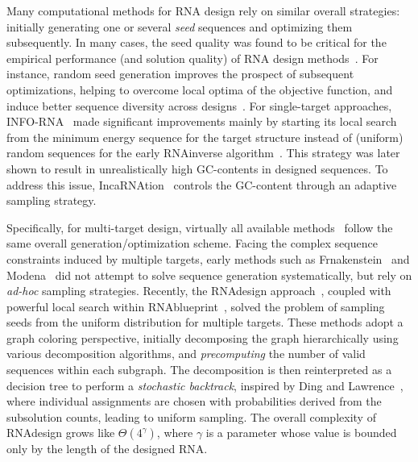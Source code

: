 \documentclass{bioinfo}
\newcommand{\Def}[1]{{\it #1}}
\newcommand{\parHead}[1]{\Final{\paragraph{#1}}}
\newcommand{\Final}[1]{#1}
\renewcommand{\Final}[1]{}
\newcommand{\Nuc}[1]{{\sf #1}}
\newcommand{\Cb}{\Nuc{C}}
\newcommand{\Gb}{\Nuc{G}}
\newcommand{\GCb}{\Gb\Cb}
\newcommand{\Software}[1]{{\ttfamily #1}}
\begin{document}
\parHead{On the importance of sampling for design.}
Many computational methods for RNA design rely on similar overall
strategies: initially generating one or several \Def{seed} sequences
and optimizing them subsequently. In many cases, the seed quality was
found to be critical for the empirical performance (and solution
quality) of RNA design methods~\cite{Levin2012}. For instance, random
seed generation improves the prospect of subsequent optimizations, helping
to overcome local optima of the objective function, and induce better
sequence diversity across designs~\cite{Reinharz2013}.  For
single-target approaches, \Software{INFO-RNA}~\cite{Busch2006} made
significant improvements mainly by starting its local search from the
minimum energy sequence for the target structure instead of (uniform)
random sequences for the early \Software{RNAinverse}
algorithm~\cite{Hofacker1994}. This strategy was later shown to result
in unrealistically high \GCb-contents in designed sequences. To
address this issue, \Software{IncaRNAtion}~\cite{Reinharz2013}
controls the \GCb-content through an adaptive sampling strategy.

\parHead{Specificities and similarities of multi-target design.}
Specifically, for multi-target design, virtually all available methods~\cite{Lyngsoe2012,HoenerzuSiederdissen2013,Taneda2015,Hammer2017} follow the same overall generation/optimization scheme.
%
Facing the complex sequence constraints induced by multiple targets, early methods such as \Software{Frnakenstein}~\cite{Lyngsoe2012} and \Software{Modena}~\cite{Taneda2015} did not attempt to solve sequence generation systematically, but rely on \emph{ad-hoc} sampling strategies. 
%
Recently, the \Software{RNAdesign} approach~\cite{HoenerzuSiederdissen2013}, coupled with powerful local search within \Software{RNAblueprint}~\cite{Hammer2017}, solved the problem of sampling seeds from the uniform distribution for multiple targets. These methods adopt a graph coloring perspective, initially decomposing the graph hierarchically using various decomposition algorithms, and \Def{precomputing} the number of valid sequences within each subgraph. The decomposition is then reinterpreted as a decision tree to perform a \Def{stochastic backtrack}, inspired by Ding and Lawrence~\cite{Ding2003}, where individual assignments are chosen with probabilities derived from the subsolution counts, leading to uniform sampling. The overall complexity of \Software{RNAdesign} grows like $\Theta(4^{\gamma})$, where $\gamma$ is a parameter whose value is bounded only by the length of the designed RNA. 
\end{document}

